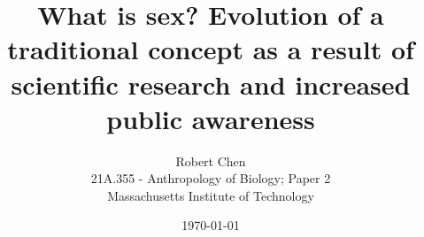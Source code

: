 


\title{What is sex? Evolution of a traditional concept as a result of scientific research and increased public awareness}

\author{
\vspace{0.5in}
Robert Chen\\
21A.355 - Anthropology of Biology; Paper 2\\
Massachusetts Institute of Technology
\vspace{1in}
}


\date{
\today
}

